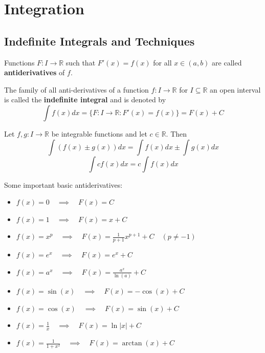 \section{Integration}

\subsection{Indefinite Integrals and Techniques}

\begin{definition}
    Functions $F: I \to \mathbb{R}$ such that $F'(x) = f(x)$ for all $x \in (a, b)$ are called \textbf{antiderivatives} of $f$.
\end{definition}

\begin{definition}
   The family of all anti-derivatives of a function $f: I \to \mathbb{R}$ for $I \subseteq \mathbb{R}$ an open interval is called the \textbf{indefinite integral} and is denoted by
   $$\int f(x) dx = \{ F: I \to \mathbb{R} : F'(x) = f(x) \} = F(x) + C $$
\end{definition}

\begin{theorem}
    Let $f, g: I \to \mathbb{R}$ be integrable functions and let $c \in \mathbb{R}$. Then
    $$\int (f(x) \pm g(x)) dx = \int f(x) dx \pm \int g(x) dx$$
    $$\int c f(x) dx = c \int f(x) dx$$
\end{theorem}

\begin{remark}
    Some important basic antiderivatives:
    \begin{itemize}
        \item $f(x) = 0 \quad \implies \quad F(x) = C$
        \item $f(x) = 1 \quad \implies \quad F(x) = x + C$
        \item $f(x) = x^p \quad \implies \quad F(x) = \frac{1}{p+1} x^{p+1} + C \quad (p \neq -1)$
        \item $f(x) = e^x \quad \implies \quad F(x) = e^x + C$
        \item $f(x) = a^x \quad \implies \quad F(x) = \frac{a^x}{\ln(a)} + C$
        \item $f(x) = \sin(x) \quad \implies \quad F(x) = -\cos(x) + C$
        \item $f(x) = \cos(x) \quad \implies \quad F(x) = \sin(x) + C$
        \item $f(x) = \frac{1}{x} \quad \implies \quad F(x) = \ln|x| + C$
        \item $f(x) = \frac{1}{1+x^2} \quad \implies \quad F(x) = \arctan(x) + C$
    \end{itemize}
\end{remark}


